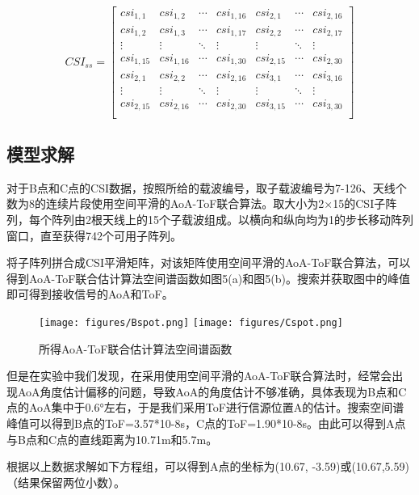 \documentclass[withoutpreface,bwprint]{cumcmthesis}
\begin{document}
\begin{equation}
CSI_{ss} = \begin{bmatrix}
csi_{1,1} & csi_{1,2} & \cdots & csi_{1,16} & csi_{2,1} & \cdots & csi_{2,16} \\
csi_{1,2} & csi_{1,3} & \cdots & csi_{1,17} & csi_{2,2} & \cdots & csi_{2,17} \\
\vdots & \vdots & \ddots & \vdots & \vdots & \ddots & \vdots \\
csi_{1,15} & csi_{1,16} & \cdots & csi_{1,30} & csi_{2,15} & \cdots & csi_{2,30}  \\
csi_{2,1} & csi_{2,2} & \cdots & csi_{2,16} & csi_{3,1} & \cdots & csi_{3,16} \\
\vdots & \vdots & \ddots & \vdots & \vdots & \ddots & \vdots \\
csi_{2,15} & csi_{2,16} & \cdots & csi_{2,30} & csi_{3,15} & \cdots & csi_{3,30}\\
\end{bmatrix}
\end{equation}

\subsection{模型求解}

对于B点和C点的CSI数据，按照所给的载波编号，取子载波编号为7-126、天线个数为8的连续片段使用空间平滑的AoA-ToF联合算法。取大小为2×15的CSI子阵列，每个阵列由2根天线上的15个子载波组成。以横向和纵向均为1的步长移动阵列窗口，直至获得742个可用子阵列。

将子阵列拼合成CSI平滑矩阵，对该矩阵使用空间平滑的AoA-ToF联合算法，可以得到AoA-ToF联合估计算法空间谱函数如图5(a)和图5(b)。搜索并获取图中的峰值即可得到接收信号的AoA和ToF。

\begin{figure}
\centering
{}
{\texttt{[image: figures/Bspot.png]}}
{\texttt{[image: figures/Cspot.png]}}
\caption{所得AoA-ToF联合估计算法空间谱函数}\label{fig:空间谱函数}
\end{figure} 

但是在实验中我们发现，在采用使用空间平滑的AoA-ToF联合算法时，经常会出现AoA角度估计偏移的问题，导致AoA的角度估计不够准确，具体表现为B点和C点的AoA集中于0.6°左右，于是我们采用ToF进行信源位置A的估计。搜索空间谱峰值可以得到B点的ToF=3.57*10-8s，C点的ToF=1.90*10-8s。由此可以得到A点与B点和C点的直线距离为10.71m和5.7m。

根据以上数据求解如下方程组，可以得到A点的坐标为(10.67, -3.59)或(10.67,5.59) （结果保留两位小数）。
\end{document}
